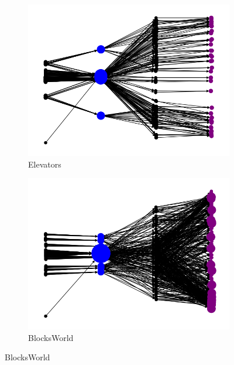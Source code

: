 \documentclass{article}
\theoremstyle{remark}
\begin{document}
\begin{figure}[t!]
\centering
\begin{subfigure}[b]{0.23\textwidth}
\centering
  \includegraphics[width=1\linewidth]{Dependencies_graphs/DepGraphElevators}
  \caption{Elevators}
  \label{fig:DepGraphElevators}
\end{subfigure}\hspace{5em}
\begin{subfigure}[b]{0.23\textwidth}
\centering
  \includegraphics[width=1\linewidth]{Dependencies_graphs/DepGraphBlocksWorld}
  \caption{BlocksWorld}
  \label{fig:DepGraphBlocksWorld}
\end{subfigure}\hspace{5em}

\end{figure}
\end{document}
